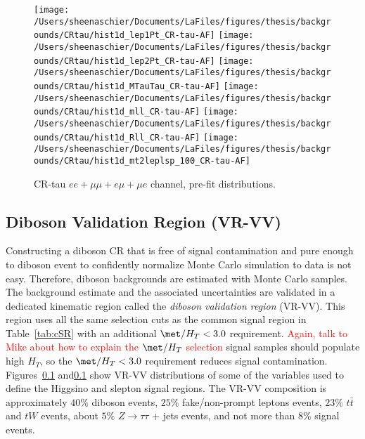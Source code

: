 \begin{figure}
    \centering
        \texttt{[image: /Users/sheenaschier/Documents/LaFiles/figures/thesis/backgrounds/CRtau/hist1d\_lep1Pt\_CR-tau-AF]}
        \texttt{[image: /Users/sheenaschier/Documents/LaFiles/figures/thesis/backgrounds/CRtau/hist1d\_lep2Pt\_CR-tau-AF]}
        \texttt{[image: /Users/sheenaschier/Documents/LaFiles/figures/thesis/backgrounds/CRtau/hist1d\_MTauTau\_CR-tau-AF]}
        \texttt{[image: /Users/sheenaschier/Documents/LaFiles/figures/thesis/backgrounds/CRtau/hist1d\_mll\_CR-tau-AF]}
        \texttt{[image: /Users/sheenaschier/Documents/LaFiles/figures/thesis/backgrounds/CRtau/hist1d\_Rll\_CR-tau-AF]}
        \texttt{[image: /Users/sheenaschier/Documents/LaFiles/figures/thesis/backgrounds/CRtau/hist1d\_mt2leplsp\_100\_CR-tau-AF]}
    \caption{CR-tau $ee+\mu\mu +e\mu + \mu e$ channel, pre-fit distributions.}
    \label{fig:CR-tau-2}
\end{figure} 

\FloatBarrier

\subsection{Diboson Validation Region (VR-VV)}
Constructing a diboson CR that is free of signal contamination and pure enough to diboson event to confidently normalize Monte Carlo simulation to data is not easy.  Therefore, diboson backgrounds are estimated with Monte Carlo samples.  The background estimate and the associated uncertainties are validated in a dedicated kinematic region called the \textit{diboson validation region} (VR-VV).  This region uses all the same selection cuts as the common signal region in Table~\ref{tab:cSR} with an additional $\met/H_T<3.0$ requirement.  \textcolor{red}{Again, talk to Mike about how to explain the $\met/H_T$ selection}  signal samples should populate high $H_T$, so the $\met/H_T<3.0$ requirement reduces signal contamination.  Figures~\ref{} and\ref{} show VR-VV distributions of some of the variables used to define the Higgsino and slepton signal regions.  The VR-VV composition is approximately $40\%$ diboson events, $25\%$ fake/non-prompt leptons events, $23\%$ $t\bar{t}$ and $tW$ events, about $5\%$ $Z\rightarrow\tau\tau$ + jets events, and not more than $8\%$ signal events.

